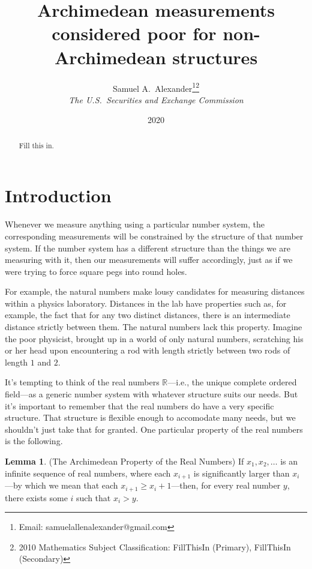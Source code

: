 \documentclass[reqno]{article}
\theoremstyle{definition}
\newtheorem{lemma}[theorem]{Lemma}
\begin{document}
\title{Archimedean measurements considered poor for non-Archimedean structures}

\author{Samuel A.~Alexander\thanks{Email:
samuelallenalexander@gmail.com}\hphantom{*}\footnote{2010 Mathematics 
Subject Classification: FillThisIn
(Primary), FillThisIn (Secondary)}\\
\emph{The U.S.\ Securities and Exchange Commission}}
\date{2020}
\maketitle

\begin{abstract}
    Fill this in.
\end{abstract}

\section{Introduction}

Whenever we measure anything using a particular number system, the
corresponding measurements will be constrained by the structure of that
number system. If the number system has a different structure than
the things we are measuring with it, then our
measurements will suffer accordingly, just as if we were trying to
force square pegs into round holes.

For example, the natural numbers make lousy candidates for measuring
distances within a physics laboratory. Distances in the lab have
properties such as, for example, the fact that for any two distinct
distances, there is an intermediate distance strictly between them.
The natural numbers lack this property. Imagine the poor physicist,
brought up in a world of only natural numbers, scratching his or her
head upon encountering a rod with length strictly between two rods
of length $1$ and $2$.

It's tempting to think of the real numbers $\mathbb R$---i.e., the unique
complete ordered field---as a generic number system with whatever
structure suits our needs. But it's important to remember that the
real numbers do have a very specific structure. That structure is
flexible enough to accomodate many needs, but we shouldn't just
take that for granted. One particular property of the real numbers
is the following.

\begin{lemma}
\label{archimedeanlemma}
(The Archimedean Property of the Real Numbers)
If $x_1,x_2,\ldots$ is an infinite sequence of real numbers,
where each $x_{i+1}$ is significantly larger than $x_i$---by which
we mean that each $x_{i+1}\geq x_i+1$---then, for every real number $y$,
there exists some $i$ such that $x_i>y$.
\end{lemma}
\end{document}
